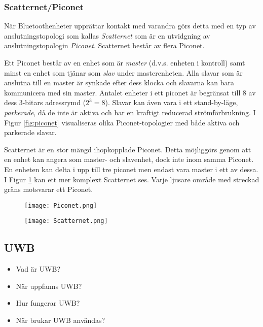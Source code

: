 \documentclass[11pt]{article}
\begin{document}
\begin{flushleft}
\subsubsection{Scatternet/Piconet}
När Bluetoothenheter upprättar kontakt med varandra görs detta med en typ av anslutningstopologi som kallas \textit{Scatternet} som är en utvidgning av anslutningstopologin \textit{Piconet}. Scatternet består av flera Piconet.\autocite{4460126}\\\bigskip

Ett Piconet består av en enhet som är \textit{master} (d.v.s. enheten i kontroll) samt minst en enhet som tjänar som \textit{slav} under masterenheten. Alla slavar som är anslutna till en master är synkade efter dess klocka och slavarna kan bara kommunicera med sin master. Antalet enheter i ett piconet är begränsat till 8 av dess 3-bitars adressrymd ($2^3=8$). Slavar kan även vara i ett stand-by-läge, \textit{parkerade}, då de inte är aktiva och har en kraftigt reducerad strömförbrukning.  I Figur \ref{fig:piconet} visualiseras olika Piconet-topologier med både aktiva och parkerade slavar. \\\bigskip

Scatternet är en stor mängd ihopkopplade Piconet. Detta möjliggörs genom att en enhet kan angera som master- och slavenhet, dock inte inom samma Piconet. En enheten kan delta i upp till tre piconet men endast vara master i ett av dessa. I Figur \ref{fig:scatternet} kan ett mer komplext Scatternet ses. Varje ljusare område med streckad gräns motsvarar ett Piconet.

\begin{figure}[h!]
\begin{minipage}{0.5\textwidth}
\centering
\texttt{[image: Piconet.png]}
\label{fig:piconet}
\end{minipage}
\begin{minipage}{0.5\textwidth}
\centering
\texttt{[image: Scatternet.png]}
\label{fig:scatternet}
\end{minipage}
\end{figure}





\subsection{UWB}
\begin{itemize}
\item Vad är UWB? 
\item När uppfanns UWB?
\item Hur fungerar UWB?
\item När brukar UWB användas?
\end{itemize}


\end{flushleft}
\end{document}
